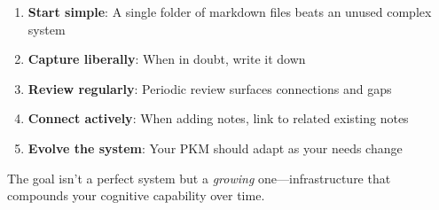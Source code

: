 \begin{enumerate}
    \item \textbf{Start simple}: A single folder of markdown files beats an unused complex system
    \item \textbf{Capture liberally}: When in doubt, write it down
    \item \textbf{Review regularly}: Periodic review surfaces connections and gaps
    \item \textbf{Connect actively}: When adding notes, link to related existing notes
    \item \textbf{Evolve the system}: Your PKM should adapt as your needs change
\end{enumerate}

The goal isn't a perfect system but a \emph{growing} one---infrastructure that compounds your cognitive capability over time.
